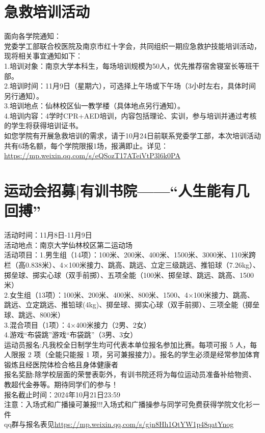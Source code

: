 \documentclass[letterpaper, 12pt]{article}
\begin{document}
\begin{multicols}{2}
\section{急救培训活动}
面向各学院通知：\\
党委学工部联合校医院及南京市红十字会，共同组织一期应急救护技能培训活动，现将相关事宜通知如下：\\
1.培训对象：南京大学本科生，每场培训规模为50人，优先推荐宿舍寝室长等班干部。\\
2.培训时间：11月9日（星期六），可选择上午场或下午场（3小时左右，具体时间另行通知）。\\
3.培训地点：仙林校区仙一教学楼（具体地点另行通知）。\\
4.培训内容：4学时CPR+AED培训，内容包括理论、实训，参与培训并通过考核的学生将获得培训证书。\\
如您学院有开展急救培训的需求，请于10月24日前联系党委学工部，本次培训活动共有6场名额，每个学院限报1场，报满即止。详见：\url{https://mp.weixin.qq.com/s/eQSozT17ATeiVtP3l6k0PA}

\section{运动会招募|有训书院——“人生能有几回搏”}
活动时间：11月8日-11月9日\\
活动地点：南京大学仙林校区第二运动场\\
活动项目：1.男生组（14项）：100米、200米、400米、1500米、3000米、110米跨栏（高0.838米）、4×100米接力、跳高、跳远、立定三级跳远、推铅球（7.26kg）、掷垒球、掷实心球（双手前掷）、五项全能（100米、掷垒球、跳远、跳高、1500米）\\
2.女生组（13项）：100米、200米、400米、800米、1500、4×100米接力、跳高、跳远、立定跳远、推铅球(4kg)、掷垒球、掷实心球（双手前掷）、三项全能（掷垒球、跳远、800米）\\
3.混合项目（1项）：4×400米接力（2男、2女）\\
4.游戏“布袋跳”游戏“布袋跳”（3男、3女）\\
运动员报名:凡我校全日制学生均可代表本单位报名参加比赛。每项可报 5 人，每人限报 2 项（全能只能报 1 项，另可兼报接力）。报名的学生必须是经常参加体育锻炼且经医院体检合格且身体健康者\\
报名奖励:除学校层面的荣誉表彰外，有训书院还将为每位运动员准备补给物资、教超代金券等。期待同学们的参与！\\
报名截止时间：2024年10月21日23:59\\
注意：入场式和广播操可兼报!!!入场式和广播操参与同学可免费获得学院文化衫一件\\
qq群与报名表见\url{https://mp.weixin.qq.com/s/gjn8Hh1QtYW1p48qatYnog}



\end{multicols}
\end{document}
